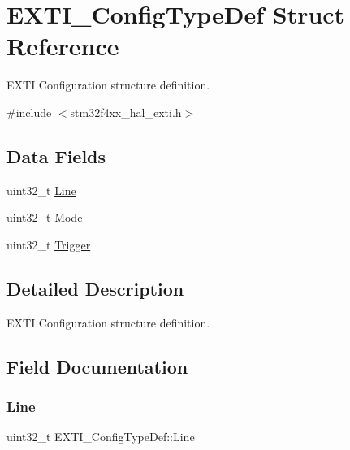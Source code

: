 \hypertarget{struct_e_x_t_i___config_type_def}{}\section{E\+X\+T\+I\+\_\+\+Config\+Type\+Def Struct Reference}
\label{struct_e_x_t_i___config_type_def}


E\+X\+TI Configuration structure definition.  




{\ttfamily \#include $<$stm32f4xx\+\_\+hal\+\_\+exti.\+h$>$}

\subsection*{Data Fields}
\begin{DoxyCompactItemize}
\item 
uint32\+\_\+t \hyperlink{struct_e_x_t_i___config_type_def_a19ad88703f9ac13e8a741afdba86f6af}{Line}
\item 
uint32\+\_\+t \hyperlink{struct_e_x_t_i___config_type_def_a6393a89a8cd198b19e10876e6f12cf5b}{Mode}
\item 
uint32\+\_\+t \hyperlink{struct_e_x_t_i___config_type_def_acf6d2ea84df5f2b705676584ae00707a}{Trigger}
\end{DoxyCompactItemize}


\subsection{Detailed Description}
E\+X\+TI Configuration structure definition. 

\subsection{Field Documentation}
\mbox{\label{struct_e_x_t_i___config_type_def_a19ad88703f9ac13e8a741afdba86f6af}} 
\subsubsection{\texorpdfstring{Line}{Line}}
{\footnotesize\ttfamily uint32\+\_\+t E\+X\+T\+I\+\_\+\+Config\+Type\+Def\+::\+Line}

